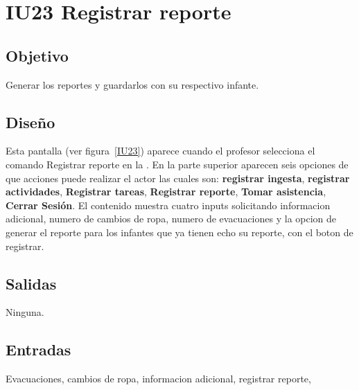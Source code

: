\section{IU23 Registrar reporte}

\subsection{Objetivo}
	Generar los reportes y guardarlos con su respectivo infante.

\subsection{Diseño}
	 Esta pantalla  (ver figura~\ref{IU23}) aparece cuando el            profesor selecciona el comando Registrar reporte en la . 
         En la parte superior aparecen seis opciones de que acciones puede realizar el actor las cuales son: {\bf registrar ingesta}, {\bf registrar actividades}, {\bf Registrar tareas}, {\bf Registrar reporte}, {\bf Tomar asistencia}, {\bf Cerrar Sesión}. 
         El contenido muestra cuatro inputs solicitando informacion adicional, numero de cambios de ropa, numero de evacuaciones y la opcion de generar el reporte para los infantes que ya tienen echo su reporte, con el boton de registrar.
         
        

\subsection{Salidas}

	Ninguna.

\subsection{Entradas}
Evacuaciones, cambios de ropa, informacion adicional, registrar reporte, 

